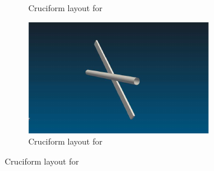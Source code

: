 \documentclass[a4paper,fleqn]{cas-sc}
\begin{document}
\begin{figure}
\begin{subfigure}[h]{0.3\textwidth}
    \caption{Cruciform layout for \angfo{}}
    \label{fig:cruciform675}
  \end{subfigure}
  \hfill
  \begin{subfigure}[h]{0.3\textwidth}
    \includegraphics[width=\textwidth]{figs/cruciform45}
    \caption{Cruciform layout for \angth{}}
    \label{fig:cruciform45}
  \end{subfigure}


\end{figure}
\end{document}
